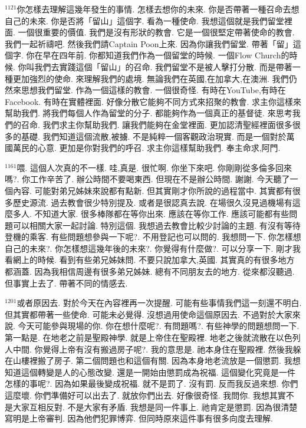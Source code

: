 \documentclass{book}
\begin{document}
$^{1121}$你怎樣去理解這幾年發生的事情.
怎樣去想你的未來.
你是否帶著一種召命去想自己的未來.
你是否將「留山」這個字.
看為一種使命.
我想這個就是我們留堂裡面.
一個很重要的價值.
我們是沒有形狀的教會.
它是一個很堅定帶著使命的教會.
我們一起祈禱吧.
然後我們請Captain Poon上來.
因為你讓我們留堂.
帶著「留」這個字.
你在早在四年前.
你都知道我們作為一個留堂的時候.
一個Flow Church的時候.
你叫我們去實踐這個「留山」的召命.
我們留堂不是被人擊打分散.
而是帶著一種更加強烈的使命.
來理解我們的處境.
無論我們在英國,在加拿大,在澳洲.
我們仍然來思想我們留堂.
作為一個這樣的教會.
一個很奇怪.
有時在YouTube,有時在Facebook.
有時在實體裡面.
好像分散它能夠不同方式來招聚的教會.
求主你這樣來幫助我們.
將我們每個人作為留堂的分子.
都能夠作為一個真正的基督徒.
來思考我們的召命.
我們求主你幫助我們.
讓我們能夠在金堂裡面.
更加認清聖經裡面很多很多的基礎.
我們知道這個流散,被擄.
不是純粹一個客觀政治現實.
而是一個對於萬國萬民的心意.
更加是你對我們的呼召.
求主你這樣幫助我們.
奉主命求,阿門.

$^{1161}$喂.
這個人次真的不一樣.
哇,真是.
很忙啊.
你坐下來吧.
你剛剛從多倫多回來嗎?.
你工作辛苦了.
辦公時間不要喝東西.
但現在不是辦公時間.
謝謝.
今天聽了一個內容.
可能對弟兄姊妹來說都有點新.
但其實剛才你所說的過程當中.
其實都有很多歷史源流.
過去教會很少特別提及.
或者是很認真去說.
在場很久沒見過機場有這麼多人.
不知道大家.
很多棒隊都在等你出來.
應該在等你工作.
應該可能都有些問題可以相關大家一起討論.
特別這個.
我想過去教會比較少討論的主題.
有沒有等待登機的乘客.
有些問題想參與一下呢?.
不用登記也可以問的.
我想問一下.
你怎樣想自己的未來?.
你怎樣想這幾年後的未來?.
你覺得有什麼做?.
可以分享一下.
剛才我看網上的時候.
看到有些弟兄姊妹問.
不要只說加拿大,英國.
其實真的有很多地方都涵蓋.
因為我相信周邊有很多弟兄姊妹.
總有不同朋友去的地方.
從來都沒聽過.
但事實上去了.
帶著不同的情感去.

$^{1201}$或者原因去.
對於今天在內容裡再一次提醒.
可能有些事情我們這一刻還不明白.
但其實都帶著一些使命.
可能未必覺得.
沒想過用使命這個原因去.
不過對於大家來說.
今天可能參與現場的你.
你在想什麼呢?.
有問題嗎?.
有些神學的問題想問一下.
第一點是.
在地老之前是聖殿神學.
就是上帝住在聖殿裡.
地老之後就流散在以色列人中間.
你覺得上帝有沒有搬過房子呢?.
我的意思是.
祂本身住在聖殿裡.
然後我躲在山樓裡搬了房子.
第二個問題也和這個有關.
因為本身地老流放是一個懲罰.
我想知道這個轉變是人的心態改變.
還是一開始由懲罰成為祝福.
這個變化究竟是一件怎樣的事呢?.
因為如果最後變成祝福.
就不是罰了.
沒有罰.
反而我反過來想.
你們這麼壞.
你們準備好可以出去了.
就放你們出去.
好像很奇怪.
我問你.
我想其實不是大家互相反對.
不是大家有矛盾.
我想是同一件事上.
祂肯定是懲罰.
因為很清楚寫明是上帝審判.
因為他們犯罪博弈.
但同時原來這件事有很多向度去理解.
\end{document}
